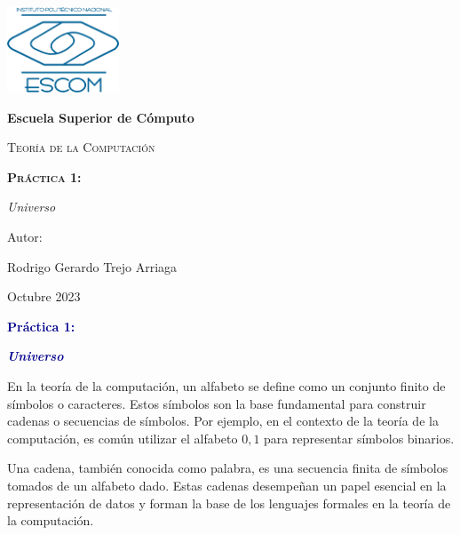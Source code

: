 \documentclass[11pt]{article} %
\begin{document}
	
	\begin{titlepage}
		\centering
		{\includegraphics[width=0.25\textwidth]{descarga}\par}
		\vspace{0.5cm}
		{\bfseries\huge Escuela Superior de Cómputo \par}
		\vspace{0.7cm}
		{\scshape\LARGE Teoría de la Computación \par}
		\vspace{0.3cm}
		\vspace{3.1cm}
		{\scshape \Huge \textbf{Práctica 1:}  \par}
		\vspace{0.03cm}
		{{\LARGE \textit{Universo}} \par}
		\vspace{3.5cm}
		{\Large Autor: \par}
		{\Large Rodrigo Gerardo Trejo Arriaga \par}
		\vspace{3cm}
		{\Large Octubre 2023 \par}
	\end{titlepage}
	
	\begin{center}
		\vspace*{0.1cm}
		{\huge \textcolor{darkBlue}{\textbf{Práctica 1:}} \par}
		
		{\Large \textcolor{darkBlue}{\textbf{\textit{Universo}}}}
	\end{center}
	
	En la teoría de la computación, un alfabeto se define como un conjunto finito de símbolos o caracteres. Estos símbolos son la base fundamental para construir cadenas o secuencias de símbolos. Por ejemplo, en el contexto de la teoría de la computación, es común utilizar el alfabeto ${0, 1}$ para representar símbolos binarios.
	
	Una cadena, también conocida como palabra, es una secuencia finita de símbolos tomados de un alfabeto dado. Estas cadenas desempeñan un papel esencial en la representación de datos y forman la base de los lenguajes formales en la teoría de la computación.
	
\end{document}
